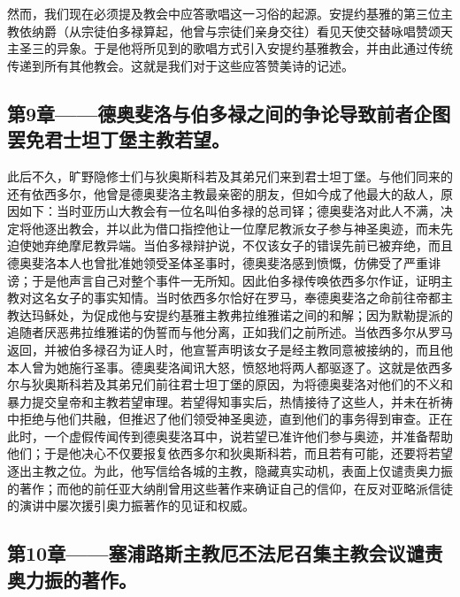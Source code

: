 然而，我们现在必须提及教会中应答歌唱这一习俗的起源。安提约基雅的第三位主教依纳爵（从宗徒伯多禄算起，他曾与宗徒们亲身交往）看见天使交替咏唱赞颂天主圣三的异象。于是他将所见到的歌唱方式引入安提约基雅教会，并由此通过传统传递到所有其他教会。这就是我们对于这些应答赞美诗的记述。\par


\subsection{第9章——德奥斐洛与伯多禄之间的争论导致前者企图罢免君士坦丁堡主教若望。}

此后不久，旷野隐修士们与狄奥斯科若及其弟兄们来到君士坦丁堡。与他们同来的还有依西多尔，他曾是德奥斐洛主教最亲密的朋友，但如今成了他最大的敌人，原因如下：当时亚历山大教会有一位名叫伯多禄的总司铎；德奥斐洛对此人不满，决定将他逐出教会，并以此为借口指控他让一位摩尼教派女子参与神圣奥迹，而未先迫使她弃绝摩尼教异端。当伯多禄辩护说，不仅该女子的错误先前已被弃绝，而且德奥斐洛本人也曾批准她领受圣体圣事时，德奥斐洛感到愤慨，仿佛受了严重诽谤；于是他声言自己对整个事件一无所知。因此伯多禄传唤依西多尔作证，证明主教对这名女子的事实知情。当时依西多尔恰好在罗马，奉德奥斐洛之命前往帝都主教达玛稣处，为促成他与安提约基雅主教弗拉维雅诺之间的和解；因为默勒提派的追随者厌恶弗拉维雅诺的伪誓而与他分离，正如我们之前所述。当依西多尔从罗马返回，并被伯多禄召为证人时，他宣誓声明该女子是经主教同意被接纳的，而且他本人曾为她施行圣事。德奥斐洛闻讯大怒，愤怒地将两人都驱逐了。这就是依西多尔与狄奥斯科若及其弟兄们前往君士坦丁堡的原因，为将德奥斐洛对他们的不义和暴力提交皇帝和主教若望审理。若望得知事实后，热情接待了这些人，并未在祈祷中拒绝与他们共融，但推迟了他们领受神圣奥迹，直到他们的事务得到审查。正在此时，一个虚假传闻传到德奥斐洛耳中，说若望已准许他们参与奥迹，并准备帮助他们；于是他决心不仅要报复依西多尔和狄奥斯科若，而且若有可能，还要将若望逐出主教之位。为此，他写信给各城的主教，隐藏真实动机，表面上仅谴责奥力振的著作；而他的前任亚大纳削曾用这些著作来确证自己的信仰，在反对亚略派信徒的演讲中屡次援引奥力振著作的见证和权威。\par


\subsection{第10章——塞浦路斯主教厄丕法尼召集主教会议谴责奥力振的著作。}

